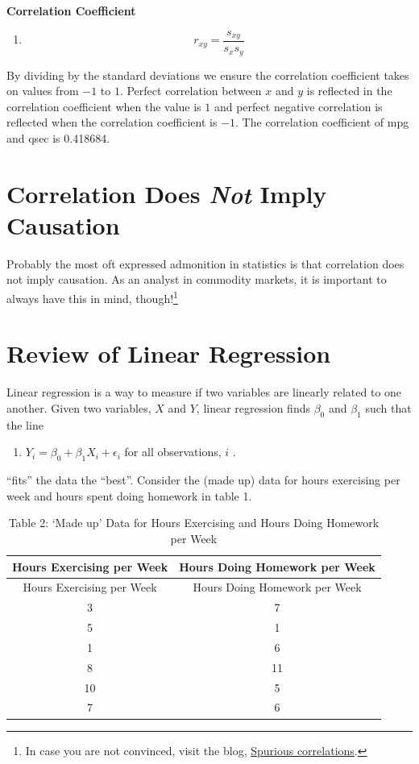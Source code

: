 \documentclass[]{book}
\providecommand{\tightlist}{%
  \setlength{\itemsep}{0pt}\setlength{\parskip}{0pt}}
\let\rmarkdownfootnote\footnote%
\def\footnote{\protect\rmarkdownfootnote}
\theoremstyle{definition}
\theoremstyle{definition}
\theoremstyle{remark}
\begin{document}
\textbf{Correlation Coefficient}

\begin{enumerate}
\def\labelenumi{\arabic{enumi}.}
\setcounter{enumi}{5}
\tightlist
\item
  \[r_{xy} = \frac{s_{xy}}{s_xs_y}\]
\end{enumerate}

By dividing by the standard deviations we ensure the correlation
coefficient takes on values from \(-1\) to \(1\). Perfect correlation
between \(x\) and \(y\) is reflected in the correlation coefficient when
the value is \(1\) and perfect negative correlation is reflected when
the correlation coefficient is \(-1\). The correlation coefficient of
mpg and qsec is 0.418684.

\section{\texorpdfstring{Correlation Does \emph{Not} Imply
Causation}{Correlation Does Not Imply Causation}}\label{correlation-does-not-imply-causation}

Probably the most oft expressed admonition in statistics is that
correlation does not imply causation. As an analyst in commodity
markets, it is important to always have this in mind, though!\footnote{In
  case you are not convinced, visit the blog,
  \href{http://www.tylervigen.com/spurious-correlations}{Spurious
  correlations}.}

\section{Review of Linear Regression}\label{review-of-linear-regression}

Linear regression is a way to measure if two variables are linearly
related to one another. Given two variables, \(X\) and \(Y\), linear
regression finds \(\beta_0\) and \(\beta_1\) such that the line

\begin{enumerate}
\def\labelenumi{\arabic{enumi}.}
\setcounter{enumi}{6}
\tightlist
\item
  \(Y_i = \beta_0 + \beta_1X_i + \epsilon_i\) for all observations,
  \(i\) .
\end{enumerate}

``fits'' the data the ``best''. Consider the (made up) data for hours
exercising per week and hours spent doing homework in table 1.

\begin{longtable}[]{@{}cc@{}}
\caption{Table 2: `Made up' Data for Hours Exercising and Hours Doing
Homework per Week}\tabularnewline
\toprule
Hours Exercising per Week & Hours Doing Homework per Week\tabularnewline
\midrule
\endfirsthead
\toprule
Hours Exercising per Week & Hours Doing Homework per Week\tabularnewline
\midrule
\endhead
3 & 7\tabularnewline
5 & 1\tabularnewline
1 & 6\tabularnewline
8 & 11\tabularnewline
10 & 5\tabularnewline
7 & 6\tabularnewline
\bottomrule
\end{longtable}
\end{document}
